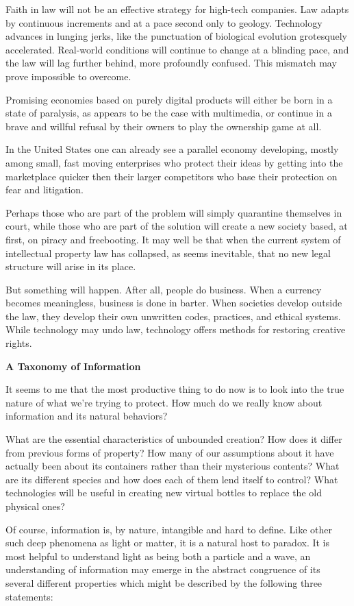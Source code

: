\documentclass[
]{article}
\begin{document}
Faith in law will not be an effective strategy for high-tech companies.
Law adapts by continuous increments and at a pace second only to
geology. Technology advances in lunging jerks, like the punctuation of
biological evolution grotesquely accelerated. Real-world conditions will
continue to change at a blinding pace, and the law will lag further
behind, more profoundly confused. This mismatch may prove impossible to
overcome.

Promising economies based on purely digital products will either be born
in a state of paralysis, as appears to be the case with multimedia, or
continue in a brave and willful refusal by their owners to play the
ownership game at all.

In the United States one can already see a parallel economy developing,
mostly among small, fast moving enterprises who protect their ideas by
getting into the marketplace quicker then their larger competitors who
base their protection on fear and litigation.

Perhaps those who are part of the problem will simply quarantine
themselves in court, while those who are part of the solution will
create a new society based, at first, on piracy and freebooting. It may
well be that when the current system of intellectual property law has
collapsed, as seems inevitable, that no new legal structure will arise
in its place.

But something will happen. After all, people do business. When a
currency becomes meaningless, business is done in barter. When societies
develop outside the law, they develop their own unwritten codes,
practices, and ethical systems. While technology may undo law,
technology offers methods for restoring creative rights.

\textbf{A Taxonomy of Information}

It seems to me that the most productive thing to do now is to look into
the true nature of what we're trying to protect. How much do we really
know about information and its natural behaviors?

What are the essential characteristics of unbounded creation? How does
it differ from previous forms of property? How many of our assumptions
about it have actually been about its containers rather than their
mysterious contents? What are its different species and how does each of
them lend itself to control? What technologies will be useful in
creating new virtual bottles to replace the old physical ones?

Of course, information is, by nature, intangible and hard to define.
Like other such deep phenomena as light or matter, it is a natural host
to paradox. It is most helpful to understand light as being both a
particle and a wave, an understanding of information may emerge in the
abstract congruence of its several different properties which might be
described by the following three statements:
\end{document}
